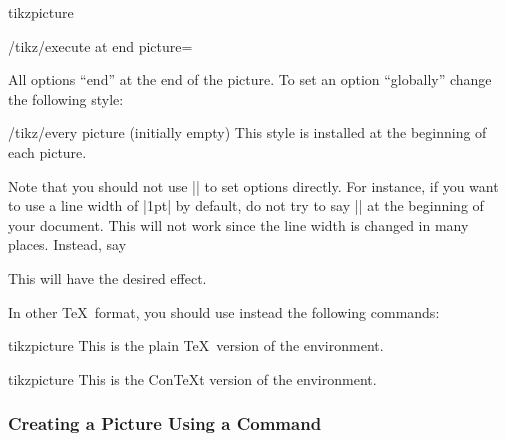 \begin{environment}{{tikzpicture}}
\begin{key}{/tikz/execute at end picture=}
\begin{codeexample}[]
\end{codeexample}
  \end{key}

  All options ``end'' at the end of the picture. To set an option
  ``globally'' change the following style:
  \begin{stylekey}{/tikz/every picture (initially \normalfont empty)}
    This style is installed at the beginning of each picture.
\begin{codeexample}
\tikzset{every picture/.style=semithick}
\end{codeexample}
  \end{stylekey}

  Note that you should not use |\tikzset| to set options directly. For
  instance, if you want to use a line width of |1pt| by default, do
  not try to say |\tikzset{line width=1pt}| at the beginning of your
  document. This will not work since the line width is changed in many
  places. Instead, say
\begin{codeexample}
\end{codeexample}
  This will have the desired effect.
\end{environment}

In other \TeX\ format, you should use instead the following commands:

\begin{plainenvironment}{{tikzpicture}}
  This is the plain \TeX\ version of the environment.
\end{plainenvironment}

\begin{contextenvironment}{{tikzpicture}}
  This is the Con\TeX t version of the environment.
\end{contextenvironment}


\subsubsection{Creating a Picture Using a Command}

